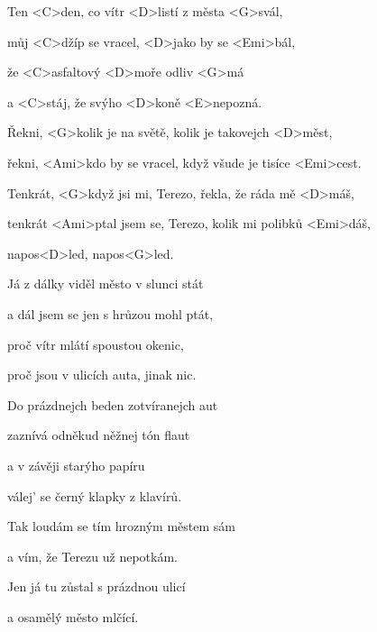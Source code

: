 

\zs
Ten <C>den, co vítr <D>listí z města <G>svál,

můj <C>džíp se vracel, <D>jako by se <Emi>bál,

že <C>asfaltový <D>moře odliv <G>má

a <C>stáj, že svýho <D>koně <E>nepozná.
\ks

\zr
Řekni, <G>kolik je na světě, kolik je takovejch <D>měst,

řekni, <Ami>kdo by se vracel, když všude je tisíce <Emi>cest.

Tenkrát, <G>když jsi mi, Terezo, řekla, že ráda mě <D>máš,

tenkrát <Ami>ptal jsem se, Terezo, kolik mi polibků <Emi>dáš,

napos<D>led, napos<G>led.
\kr

\zs
Já z dálky viděl město v slunci stát

a dál jsem se jen s hrůzou mohl ptát,

proč vítr mlátí spoustou okenic,

proč jsou v ulicích auta, jinak nic.
\ks

\zr \kr

\zs
Do prázdnejch beden zotvíranejch aut

zaznívá odněkud něžnej tón flaut

a v závěji starýho papíru

válej' se černý klapky z klavírů.
\ks

\zr \kr

\zs
Tak loudám se tím hrozným městem sám

a vím, že Terezu už nepotkám.

Jen já tu zůstal s prázdnou ulicí

a osamělý město mlčící.
\ks

\zr \kr

\kp
